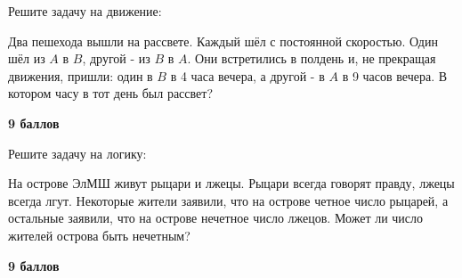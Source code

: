  Решите задачу на движение:

Два пешехода вышли на рассвете. Каждый шёл с постоянной скоростью. Один шёл из $A$ в $B$, другой - из $B$ в $A$. Они встретились в полдень и, не прекращая движения, пришли: один в $B$ в 4 часа вечера, а другой - в $A$ в 9 часов вечера. В котором часу в тот день был рассвет?

\begin{flushright} \textbf{9 баллов}\\ 
\end{flushright}

 Решите задачу на логику:

На острове ЭлМШ живут рыцари и лжецы. Рыцари всегда говорят правду, лжецы всегда лгут. Некоторые жители заявили, что на острове четное число рыцарей, а остальные заявили, что на острове нечетное число лжецов. Может ли число жителей острова быть нечетным?

\begin{flushright} \textbf{9 баллов}\\ 
\end{flushright}









